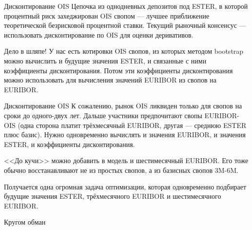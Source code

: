 \documentclass{beamer}
\begin{document}
\begin{frame}{Дисконтирование OIS}
\justify
Цепочка из однодневных депозитов под ESTER, в которой процентный риск захеджирован OIS свопом --- лучшее приближение теоретической безрисковой процентной ставки. Текущий рыночный консенсус --- использовать дисконтирование по OIS для оценки деривативов.

\justify
Дело в шляпе! У нас есть котировки OIS свопов, из которых методом bootstrap можно вычислить и будущие значения ESTER, и связанные с ними коэффициенты дисконтирования. Потом эти коэффициенты дисконтирования можно использовать для вычисления значений EURIBOR из свопов на EURIBOR.
\end{frame}



\begin{frame}{Дисконтирование OIS}
\justify
К сожалению, рынок OIS ликвиден только для свопов на сроки до одного-двух лет. Дальше участники предпочитают свопы EURIBOR-OIS (одна сторона платит трёхмесячный EURIBOR, другая --- среднюю ESTER плюс базис). Нужно одновременно вычислять и значения EURIBOR, и значения ESTER, и коэффициенты дисконтирования.

\justify
<<До кучи>> можно добавить в модель и шестимесячный EURIBOR. Его тоже обычно восстанавливают не из простых свопов, а из базисных свопов 3M-6M.

\justify
Получается одна огромная задача оптимизации, которая одновременно подбирает будущие значения ESTER, трёхмесячного EURIBOR и шестимесячного EURIBOR.
\end{frame}






\begin{frame}{Кругом обман}
\centering
{}
\end{frame}
\end{document}
